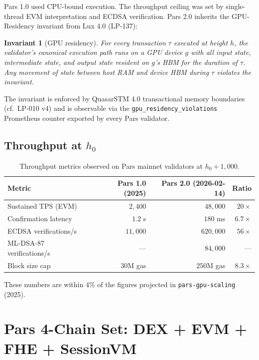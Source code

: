 \documentclass[11pt,a4paper]{article}
\newtheorem{invariant}{Invariant}[section]
\begin{document}
Pars 1.0 used CPU-bound execution. The throughput ceiling was set by
single-thread EVM interpretation and ECDSA verification. Pars 2.0
inherits the GPU-Residency invariant from Lux 4.0 (LP-137):

\begin{invariant}[GPU residency]
For every transaction $\tau$ executed at height $h$, the validator's
canonical execution path runs on a GPU device $g$ with all input
state, intermediate state, and output state resident on $g$'s HBM for
the duration of $\tau$. Any movement of state between host RAM and
device HBM during $\tau$ violates the invariant.
\end{invariant}

The invariant is enforced by QuasarSTM 4.0 transactional memory
boundaries (cf.\ LP-010 v4) and is observable via the
\texttt{gpu\_residency\_violations} Prometheus counter exported by every
Pars validator.

\subsection{Throughput at $h_0$}

\begin{table}[H]
\centering
\small
\begin{tabular}{lrrr}
\toprule
\textbf{Metric} & \textbf{Pars 1.0 (2025)} & \textbf{Pars 2.0 (2026-02-14)} & \textbf{Ratio} \\
\midrule
Sustained TPS (EVM) & $2{,}400$ & $48{,}000$ & $20\times$ \\
Confirmation latency & $1.2$ s & $180$ ms & $6.7\times$ \\
ECDSA verifications/s & $11{,}000$ & $620{,}000$ & $56\times$ \\
ML-DSA-87 verifications/s & --- & $84{,}000$ & --- \\
Block size cap & $30$M gas & $250$M gas & $8.3\times$ \\
\bottomrule
\end{tabular}
\caption{Throughput metrics observed on Pars mainnet validators at $h_0 + 1{,}000$.}
\end{table}

These numbers are within $4\%$ of the figures projected in
\texttt{pars-gpu-scaling} (2025).

\section{Pars 4-Chain Set: DEX + EVM + FHE + SessionVM}
\label{sec:chain-set}
\end{document}
